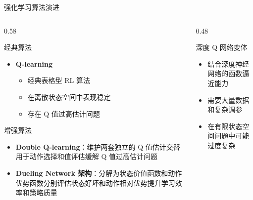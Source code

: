 \begin{frame}{强化学习算法演进}
    \begin{columns}[T]
        \begin{column}{0.58\textwidth}
            \begin{block}{\normalsize 经典算法}
                \begin{itemize}
                    \item \textbf{Q-learning}
                    \begin{itemize}
                        \item 经典表格型 RL 算法
                        \item 在离散状态空间中表现稳定
                        \item 存在 Q 值过高估计问题
                    \end{itemize}
                \end{itemize}
            \end{block}


            \begin{alertblock}{\normalsize 增强算法}
                \begin{itemize}
                    \item \textbf{Double Q-learning}：维护两套独立的 Q 值估计交替用于动作选择和值评估缓解 Q 值过高估计问题
                    \item \textbf{Dueling Network 架构}：分解为状态价值函数和动作优势函数分别评估状态好坏和动作相对优势提升学习效率和策略质量
                \end{itemize}
            \end{alertblock}
        \end{column}

        \begin{column}{0.48\textwidth}
            \begin{exampleblock}{\normalsize 深度 Q 网络变体}
                \begin{itemize}
                    \item 结合深度神经网络的函数逼近能力
                    \item 需要大量数据和复杂调参
                    \item 在有限状态空间问题中可能过度复杂
                \end{itemize}

                \vspace{0.5em}


\end{exampleblock}
\end{column}
\end{columns}
\end{frame}
